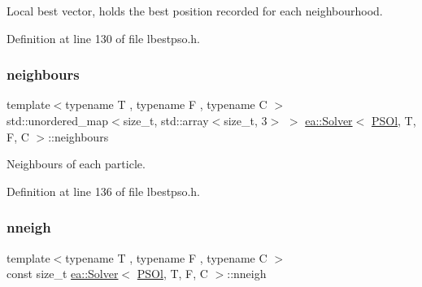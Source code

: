 Local best vector, holds the best position recorded for each neighbourhood. 



Definition at line 130 of file lbestpso.\+h.

\mbox{\label{classea_1_1_solver_3_01_p_s_ol_00_01_t_00_01_f_00_01_c_01_4_ab92e8a0460092b8264bd9023a3455257}} 
\subsubsection{\texorpdfstring{neighbours}{neighbours}}
{\footnotesize\ttfamily template$<$typename T , typename F , typename C $>$ \\
std\+::unordered\+\_\+map$<$size\+\_\+t, std\+::array$<$size\+\_\+t, 3$>$ $>$ \hyperlink{classea_1_1_solver}{ea\+::\+Solver}$<$ \hyperlink{structea_1_1_p_s_ol}{P\+S\+Ol}, T, F, C $>$\+::neighbours\hspace{0.3cm}{\ttfamily [private]}}



Neighbours of each particle. 



Definition at line 136 of file lbestpso.\+h.

\mbox{\label{classea_1_1_solver_3_01_p_s_ol_00_01_t_00_01_f_00_01_c_01_4_adb34cfcd87307ee2271b5aa5ffdd779d}} 
\subsubsection{\texorpdfstring{nneigh}{nneigh}}
{\footnotesize\ttfamily template$<$typename T , typename F , typename C $>$ \\
const size\+\_\+t \hyperlink{classea_1_1_solver}{ea\+::\+Solver}$<$ \hyperlink{structea_1_1_p_s_ol}{P\+S\+Ol}, T, F, C $>$\+::nneigh\hspace{0.3cm}{\ttfamily [private]}}



